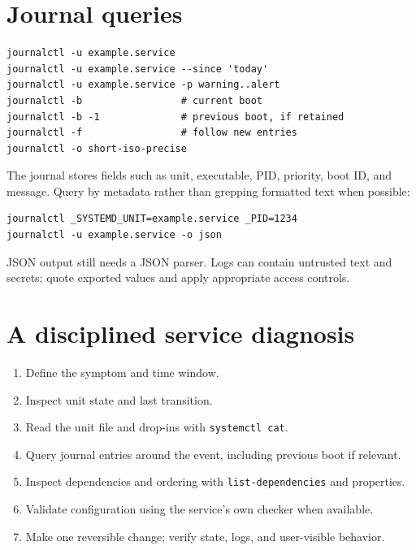 \documentclass[11pt,oneside,openany]{book}
\begin{document}
\section{Journal queries}
\begin{lstlisting}
journalctl -u example.service
journalctl -u example.service --since 'today'
journalctl -u example.service -p warning..alert
journalctl -b                 # current boot
journalctl -b -1              # previous boot, if retained
journalctl -f                 # follow new entries
journalctl -o short-iso-precise
\end{lstlisting}
The journal stores fields such as unit, executable, PID, priority, boot ID, and message. Query by metadata rather than grepping formatted text when possible:
\begin{lstlisting}
journalctl _SYSTEMD_UNIT=example.service _PID=1234
journalctl -u example.service -o json
\end{lstlisting}
JSON output still needs a JSON parser. Logs can contain untrusted text and secrets; quote exported values and apply appropriate access controls.

\section{A disciplined service diagnosis}
\begin{enumerate}
  \item Define the symptom and time window.
  \item Inspect unit state and last transition.
  \item Read the unit file and drop-ins with \texttt{systemctl cat}.
  \item Query journal entries around the event, including previous boot if relevant.
  \item Inspect dependencies and ordering with \texttt{list-dependencies} and properties.
  \item Validate configuration using the service's own checker when available.
  \item Make one reversible change; verify state, logs, and user-visible behavior.
\end{enumerate}
\end{document}
